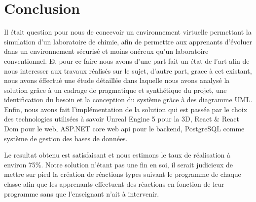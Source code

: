 \chapter*{Conclusion}

Il était question pour nous de concevoir un environnement virtuelle permettant la simulation d'un laboratoire de chimie, afin de permettre aux apprenants d'évoluer dans un environnement sécurisé et moins onéreux qu'un laboratoire conventionnel.
Et pour ce faire nous avons d'une part fait un état de l'art afin de nous interesser aux travaux réalisés sur le sujet, d'autre part, grace à cet existant, nous avons éffectué une étude détaillée dans laquelle nous avons analysé la solution grâce à un cadrage de pragmatique et synthétique du projet, une identification du besoin et la conception du système grâce à des diagramme UML. 
Enfin, nous avons fait l'implémentation de la solution qui est passée par le choix des technologies utilisées à savoir Unreal Engine 5 pour la 3D, React \& React Dom pour le web, ASP.NET core web api pour le backend, PostgreSQL comme système de gestion des bases de données.

Le resultat obtenu est satisfaisant et nous estimons le taux de réalisation à environ 75\%. 
Notre solution n'étant pas une fin en soi, il serait judicieux de mettre sur pied la création de réactions types suivant le programme de chaque classe afin que les apprenants effectuent des réactions en fonction de leur programme sans que l'enseignant n'ait à intervenir.